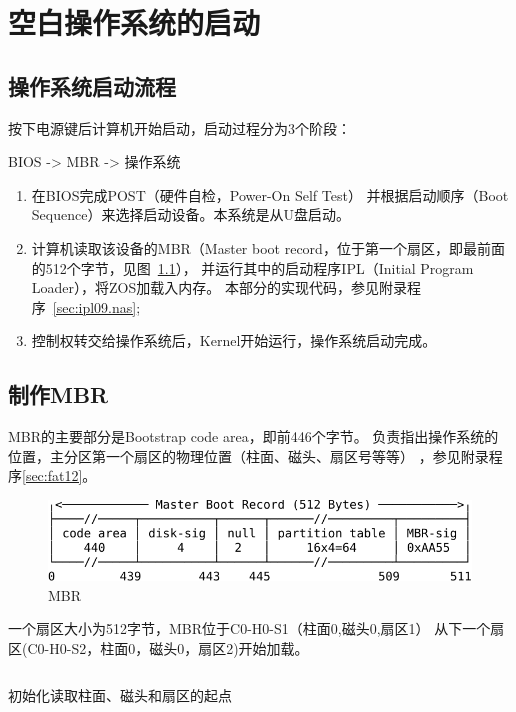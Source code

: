 \chapter{空白操作系统的启动}

\section{操作系统启动流程}

按下电源键后计算机开始启动，启动过程分为3个阶段\cite{阮一峰2014如何变得有思想}：
\begin{center}BIOS -> MBR -> 操作系统\end{center}

\begin{enumerate}
\item 在BIOS完成POST（硬件自检，Power-On Self Test）
  并根据启动顺序（Boot Sequence）来选择启动设备。本系统是从U盘启动。
\item 计算机读取该设备的MBR（Master boot record，位于第一个扇区，即最前面的512个字节，见图~\ref{fig:mbr}），
  并运行其中的启动程序IPL（Initial Program Loader），将ZOS加载入内存。
  本部分的实现代码，参见附录程序~\ref{sec:ipl09.nas};
\item 控制权转交给操作系统后，Kernel开始运行，操作系统启动完成。
\end{enumerate}

\section{制作MBR}

MBR的主要部分是Bootstrap code area，即前446个字节。
负责指出操作系统的位置，主分区第一个扇区的物理位置（柱面、磁头、扇区号等等）
，参见附录程序\ref{sec:fat12}。

\begin{figure}[H]
  \centering
  \includegraphics[width=1\textwidth]{fig/mbr.pdf}
  \caption{MBR}
  \label{fig:mbr}
\end{figure}

一个扇区大小为512字节，MBR位于C0-H0-S1（柱面0,磁头0,扇区1）\cite{刘伟2010数据恢复技术深度揭秘}
从下一个扇区(C0-H0-S2，柱面0，磁头0，扇区2)开始加载。
\begin{listing}[H]
  \inputminted[tabsize=2, firstline=43, lastline=45,
  linenos=true]{nasm}{../ZOS/src/kernel/ipl09.nas}
  \caption{初始化读取柱面、磁头和扇区的起点}
  \label{sec:chs}
\end{listing}

